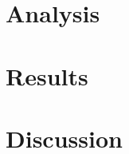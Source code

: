 \section{Analysis}
\label{sec:methodology}
%


\section{Results}
\label{sec:result}

\clearpage

\section{Discussion}
\label{sec:discussion}


\clearpage






